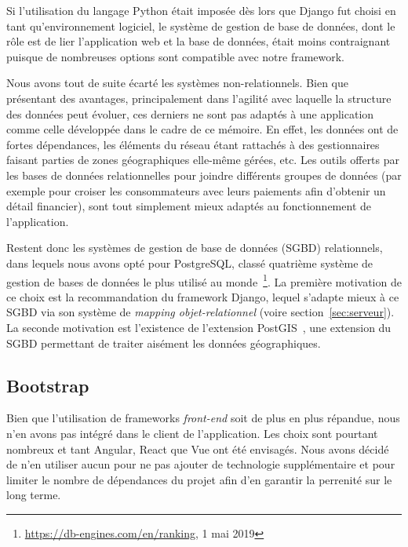 \documentclass{EPL-master-thesis-covers-FR}
\begin{document}
				Si l'utilisation du langage Python était imposée dès lors que Django fut choisi en tant qu'environnement logiciel, le système de gestion de base de données, dont le rôle est de lier l'application web et la base de données, était moins contraignant puisque de nombreuses options sont compatible avec notre framework.

				Nous avons tout de suite écarté les systèmes non-relationnels. Bien que présentant des avantages, principalement dans l'agilité avec laquelle la structure des données peut évoluer, ces derniers ne sont pas adaptés à une application comme celle développée dans le cadre de ce mémoire. En effet, les données ont de fortes dépendances, les éléments du réseau étant rattachés à des gestionnaires faisant parties de zones géographiques elle-même gérées, etc. Les outils offerts par les bases de données relationnelles pour joindre différents groupes de données (par exemple pour croiser les consommateurs avec leurs paiements afin d'obtenir un détail financier), sont tout simplement mieux adaptés au fonctionnement de l'application.

				Restent donc les systèmes de gestion de base de données (SGBD) relationnels, dans lequels nous avons opté pour PostgreSQL, classé quatrième système de gestion de bases de données le plus utilisé au monde~\footnote{\url{https://db-engines.com/en/ranking}, 1 mai 2019}. La première motivation de ce choix est la recommandation du framework Django, lequel s'adapte mieux à ce SGBD via son système de \emph{mapping objet-relationnel} (voire section~\ref{sec:serveur}). La seconde motivation est l'existence de l'extension PostGIS~\cite{ref:postgis}, une extension du SGBD permettant de traiter aisément les données géographiques.

			\subsection*{Bootstrap}

				Bien que l'utilisation de frameworks \emph{front-end} soit de plus en plus répandue, nous n'en avons pas intégré dans le client de l'application. Les choix sont pourtant nombreux et tant Angular, React que Vue ont été envisagés. Nous avons décidé de n'en utiliser aucun pour ne pas ajouter de technologie supplémentaire et pour limiter le nombre de dépendances du projet afin d'en garantir la perrenité sur le long terme.
\end{document}
